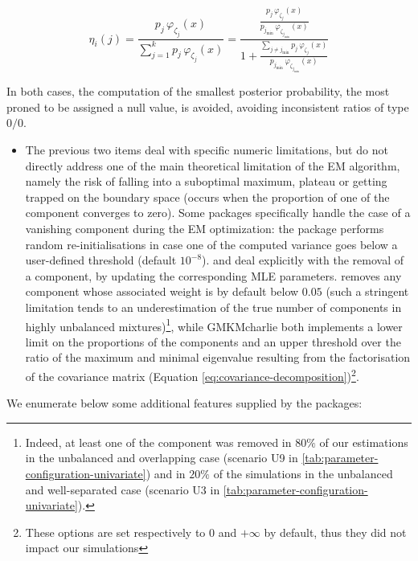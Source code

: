 \begin{equation}
\eta_{i} (j) = \frac{p_{j} \, \varphi_{\zeta_j} (x)}{\sum_{j=1}^k p_{j} \, \varphi_{\zeta_j} (x)}=\frac{\frac{p_{j} \, \varphi_{\zeta_j} (x)}{p_{j_{\min}} \, \varphi_{\zeta_{j_{\min}}} (x)}}{1+ \frac{\sum_{j\neq j_{\min}} p_{j} \, \varphi_{\zeta_j} (x)}{p_{j_{\min}} \, \varphi_{\zeta_{j_{\min}}} (x)}}
    \label{eq:trick-underflow}
\end{equation}

In both cases, the computation of the smallest posterior probability, the most proned to be assigned a null value, is avoided, avoiding inconsistent ratios of type \(0/0\).

\begin{itemize}
\tightlist
\item
  The previous two items deal with specific numeric limitations, but do not directly address one of the main theoretical limitation of the EM algorithm, namely the risk of falling into a suboptimal maximum, plateau or getting trapped on the boundary space (occurs when the proportion of one of the component converges to zero). Some packages specifically handle the case of a vanishing component during the EM optimization: the  package performs random re-initialisations in case one of the computed variance goes below a user-defined threshold (default \(10^{-8}\)).  and  deal explicitly with the removal of a component, by updating the corresponding MLE parameters.  removes any component whose associated weight is by default below \(0.05\) (such a stringent limitation tends to an underestimation of the true number of components in highly unbalanced mixtures)\footnote{Indeed, at least one of the component was removed in \(80\%\) of our estimations in the unbalanced and overlapping case (scenario U9 in \ref{tab:parameter-configuration-univariate}) and in \(20\%\) of the simulations in the unbalanced and well-separated case (scenario U3 in \ref{tab:parameter-configuration-univariate}).}, while GMKMcharlie both implements a lower limit on the proportions of the components and an upper threshold over the ratio of the maximum and minimal eigenvalue resulting from the factorisation of the covariance matrix (Equation \eqref{eq:covariance-decomposition})\footnote{These options are set respectively to 0 and \(+\infty\) by default, thus they did not impact our simulations}.
\end{itemize}

We enumerate below some additional features supplied by the packages:

